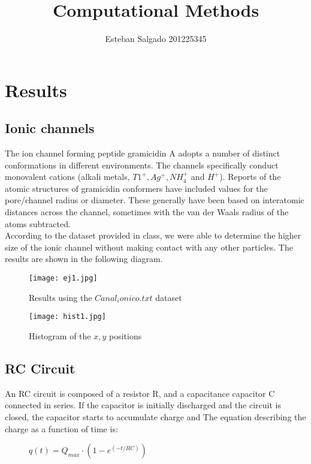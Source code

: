 \documentclass{article}
\begin{document}
\title{Computational Methods}
\author{Esteban Salgado
201225345}

\maketitle

\section{Results}
\subsection{Ionic channels}
The ion channel forming peptide gramicidin A adopts a number of distinct conformations in different environments. The channels specifically conduct monovalent cations (alkali metals, $T1^+, Ag^+, NH^+_4$ and $H^+$). Reports of the atomic structures of gramicidin conformers have included values for the pore/channel radius or diameter. These generally have been based on interatomic distances across the channel, sometimes with the van der Waals radius of the atoms subtracted. 
\\According to the dataset provided in class, we were able to determine the higher size of the ionic channel without making contact with any other particles.
The results are shown in the following diagram.

\begin{figure}[h!]
   \centering
    \texttt{[image: ej1.jpg]}
    \caption{Results using the $Canal_ionico.txt$ dataset}
    \label{simulationfigure}
\end{figure}

\begin{figure}
   \centering
    \texttt{[image: hist1.jpg]}
    \caption{Histogram of the $x,y$ positions}
    \label{histogram}
\end{figure}

\subsection{RC Circuit}
An RC circuit is composed of a resistor R, and a capacitance capacitor C connected in series. If the capacitor is initially discharged and the circuit is closed, the capacitor starts to accumulate charge and The equation describing the charge as a function of time is:

\begin{figure}[h!]
   \centering
$q(t)=Q_{max}\cdot(1-e^{(-t/RC)})$
\end{figure}
\end{document}
